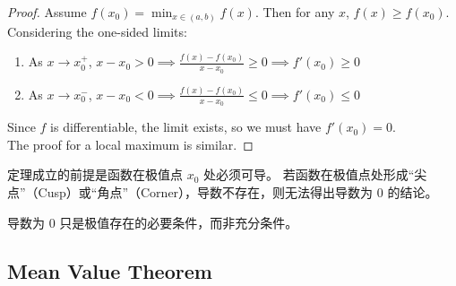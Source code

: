 \documentclass[
	UTF-8,
	11pt, %
	a4paper, %
]{LegrandOrangeBook}
\begin{document}
\begin{analysis}
\begin{figure}[H]
        \end{figure}
    \end{analysis}

    \begin{proof}
    Assume $f(x_0) = \min_{x \in (a, b)} f(x)$. Then for any $x$, $f(x) \ge f(x_0)$.
    Considering the one-sided limits:
    \begin{enumerate}
        \item As $x \to x_0^+$, $x - x_0 > 0 \implies \frac{f(x) - f(x_0)}{x - x_0} \ge 0 \implies f'(x_0) \ge 0$
        \item As $x \to x_0^-$, $x - x_0 < 0 \implies \frac{f(x) - f(x_0)}{x - x_0} \le 0 \implies f'(x_0) \le 0$
    \end{enumerate}
    Since $f$ is differentiable, the limit exists, so we must have $f'(x_0) = 0$.\\

    The proof for a local maximum is similar.
    \end{proof}

    \begin{remark}
        定理成立的前提是函数在极值点 $x_0$ 处必须可导。
        若函数在极值点处形成“尖点”（Cusp）或“角点”（Corner），导数不存在，则无法得出导数为 0 的结论。
    \end{remark}

    \begin{remark}
        导数为 $0$ 只是极值存在的必要条件，而非充分条件。
    \end{remark}

    \newpage

    \subsection{Mean Value Theorem}
\end{document}
